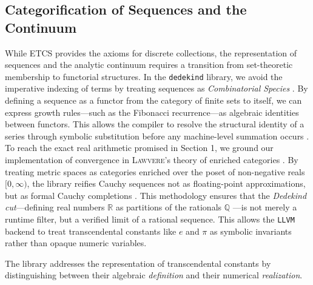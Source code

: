 \documentclass[11pt, a4paper]{report}
\begin{document}
\subsection{Categorification of Sequences and the Continuum}

While \textsc{ETCS} provides the axioms for discrete collections, the representation of sequences and the analytic continuum requires a transition from set-theoretic membership to functorial structures.
In the \texttt{dedekind} library, we avoid the imperative indexing of terms by treating sequences as \emph{Combinatorial Species} \cite{joyal1981species}.
By defining a sequence as a functor from the category of finite sets to itself, we can express growth rules—such as the Fibonacci recurrence—as algebraic identities between functors.
This allows the compiler to resolve the structural identity of a series through symbolic substitution before any machine-level summation occurs \cite{joyal1986analytic}.
To reach the exact real arithmetic promised in Section 1, we ground our implementation of convergence in \textsc{Lawvere}'s theory of enriched categories \cite{lawvere1973metric}.
By treating metric spaces as categories enriched over the poset of non-negative reals $[0, \infty)$, the library reifies Cauchy sequences not as floating-point approximations, but as formal Cauchy completions \cite{borceux1986cauchy}.
This methodology ensures that the \emph{Dedekind cut}—defining real numbers $\mathbb{R}$ as partitions of the rationals $\mathbb{Q}$ \cite{lawvere2003sets}—is not merely a runtime filter, but a verified limit of a rational sequence.
This allows the \texttt{LLVM} backend to treat transcendental constants like $e$ and $\pi$ as symbolic invariants rather than opaque numeric variables.

The library addresses the representation of transcendental constants by distinguishing between their algebraic \emph{definition} and their numerical \emph{realization}.
\end{document}
